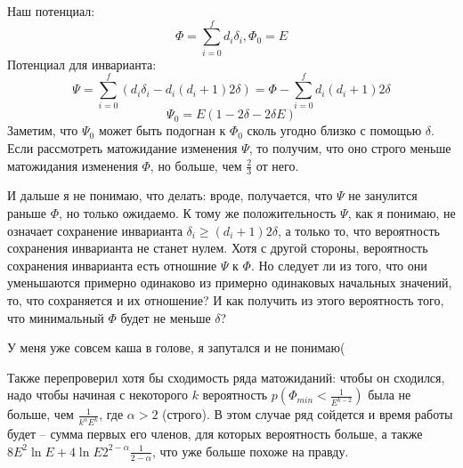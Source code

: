 \documentclass[a4paper]{article}
\begin{document}
 Наш потенциал:
 $$\Phi = \sum_{i = 0}^f d_i \delta_i, \Phi_0 = E$$
 Потенциал для инварианта:
 $$\Psi = \sum_{i = 0}^f (d_i \delta_i - d_i(d_i + 1)2\delta) = \Phi - \sum_{i = 0}^f d_i(d_i + 1)2\delta$$
 $$\Psi_0 = E(1 - 2\delta - 2\delta E)$$
 Заметим, что $\Psi_0$ может быть подогнан к $\Phi_0$ сколь угодно близко с помощью $\delta$.
 Если рассмотреть матожидание изменения $\Psi$, то получим, что оно строго меньше матожидания изменения $\Phi$, но больше, чем $\frac{2}{3}$ от него.
 
 И дальше я не понимаю, что делать: вроде, получается, что $\Psi$ не занулится раньше $\Phi$, но только ожидаемо. К тому же положительность $\Psi$, как я понимаю, не означает сохранение инварианта $\delta_i \ge (d_i + 1)2\delta$, а только то, что вероятность сохранения инварианта не станет нулем. Хотя с другой стороны, вероятность сохранения инварианта есть отношние $\Psi$ к $\Phi$. Но следует ли из того, что они уменьшаются примерно одинаково из примерно одинаковых начальных значений, то, что сохраняется и их отношение? И как получить из этого вероятность того, что минимальный $\Phi$ будет не меньше $\delta$?
 
 У меня уже совсем каша в голове, я запутался и не понимаю(
 
 Также перепроверил хотя бы сходимость ряда матожиданий: чтобы он сходился, надо чтобы начиная с некоторого $k$ вероятность $p(\Phi_{min} < \frac{1}{E^{k - 2}})$ была не больше, чем $\frac{1}{k^\alpha E^k}$, где $\alpha > 2$ (строго). В этом случае ряд сойдется и время работы будет -- сумма первых его членов, для которых вероятность больше, а также $8E^2\ln E + 4\ln E 2^{2 - \alpha} \frac{1}{2 - \alpha}$, что уже больше похоже на правду.
 
\end{document}
